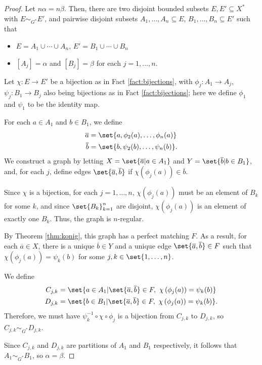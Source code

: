 \begin{proof}
  Let $n\alpha = n\beta$. Then, there are two disjoint bounded subsets $E,E'\subseteq X^{\ast}$ with $E\sim_{G^{\ast}}E'$, and pairwise disjoint subsets $A_1,\dots,A_n\subseteq E$, $B_1,\dots,B_n\subseteq E'$ such that
  \begin{itemize}
    \item $E = A_1\cup\cdots\cup A_n$, $E' = B_1\cup\cdots\cup B_n$
    \item $\left[ A_j \right] = \alpha$ and $\left[B_j\right] = \beta$ for each $j=1,\dots,n$.
  \end{itemize}
  Let $\chi\colon E\rightarrow E'$ be a bijection as in Fact \ref{fact:bijections}, with $\phi_j\colon A_1\rightarrow A_j$, $\psi_j\colon B_1\rightarrow B_j$ also being bijections as in Fact \ref{fact:bijections}; here we define $\phi_1$ and $\psi_1$ to be the identity map.\newline

  For each $a\in A_1$ and $b\in B_1$, we define
  \begin{align*}
    \overline{a} &= \set{a,\phi_2(a),\dots,\phi_n(a)}\\
    \overline{b} &= \set{b,\psi_2(b),\dots,\psi_n(b)}.
  \end{align*}
  We construct a graph by letting $X = \set{\overline{a}| a\in A_1}$ and $Y = \set{\overline{b}| b\in B_1}$, and, for each $j$, define edges $\set{\overline{a},\overline{b}}$ if $\chi\left(\phi_j(a)\right)\in \overline{b}$.\newline

  Since $\chi$ is a bijection, for each $j=1,\dots,n$, $\chi\left(\phi_j(a)\right)$ must be an element of $B_k$ for some $k$, and since $\set{B_k}_{k=1}^{n}$ are disjoint, $\chi\left(\phi_j(a)\right)$ is an element of exactly one $B_k$. Thus, the graph is $n$-regular.\newline

  By Theorem \ref{thm:konig}, this graph has a perfect matching $F$. As a result, for each $\overline{a}\in X$, there is a unique $\overline{b}\in Y$ and a unique edge $\set{\overline{a},\overline{b}}\in F$ such that $\chi\left(\phi_j(a)\right) = \psi_k(b)$ for some $j,k\in \set{1,\dots,n}$.\newline

  We define
  \begin{align*}
    C_{j,k} &= \set{a\in A_1| \set{\overline{a},\overline{b}}\in F,~\chi\left(\phi_j(a)\right) = \psi_k(b)}\\
    D_{j,k} &= \set{b\in B_1| \set{\overline{a},\overline{b}}\in F,~\chi\left(\phi_j(a)\right) = \psi_k(b)}.
  \end{align*}
  Therefore, we must have $\psi_{k}^{-1}\circ \chi\circ \phi_j$ is a bijection from $C_{j,k}$ to $D_{j,k}$, so $C_{j,k}\sim_{G^{\ast}}D_{j,k}$.\newline

  Since $C_{j,k}$ and $D_{j,k}$ are partitions of $A_1$ and $B_1$ respectively, it follows that $A_1\sim_{G^{\ast}}B_1$, so $\alpha = \beta$.
\end{proof}
